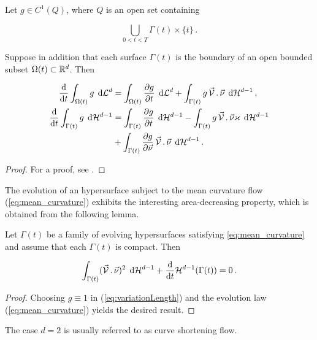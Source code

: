 \begin{lemma}
Let $g \in C^1(Q)$, where $Q$ is an open set containing

\begin{equation}
\bigcup_{0 < t < T} \Gamma(t) \times \{ t \} \, .
\end{equation}

Suppose in addition that each surface $\Gamma(t)$ is the boundary of an open
bounded subset $\Omega(t) \subset {\mathbb R}^{d}$. Then

\begin{align}
\frac{\rm d}{{\rm d}t} \int_{\Omega(t)} g \, \;{\rm d}{\cal L}^{d} & =
\int_{\Omega(t)} \frac{\partial g}{\partial t} \, \;{\rm d}{\cal L}^{d}
+ \int_{\Gamma(t)} g \,\vec{\mathcal{V}}\,.\,\vec\nu \, \;{\rm d}{\cal H}^{d-1} \, ,
\label{eq:variationVolume} \\
\frac{\rm d}{{\rm d}t} \int_{\Gamma(t)} g \, \;{\rm d}{\cal H}^{d-1} & =
\int_{\Gamma(t)} \frac{\partial g}{\partial t} \, \;{\rm d}{\cal H}^{d-1} -
\int_{\Gamma(t)} g \, \vec{\mathcal{V}}\,.\,\vec\nu \varkappa \, \;{\rm d}{\cal H}^{d-1}
\nonumber \\
& + \int_{\Gamma(t)} \frac{\partial g}{\partial \vec{\nu}}\,
\vec{\mathcal{V}}\,.\,\vec\nu \, \;{\rm d}{\cal H}^{d-1} \, .
\label{eq:variationLength}
\end{align}
\end{lemma}

\begin{proof}
For a proof, see \cite[\S~2.6, Lemma 2.1]{DeckelnickDE05}.
\end{proof}

The evolution of an hypersurface subject to the mean curvature flow
(\ref{eq:mean_curvature}) exhibits the interesting area-decreasing property,
which is obtained from the following lemma.

\begin{lemma}
Let $\Gamma(t)$ be a family of evolving hypersurfaces
satisfying \eqref{eq:mean_curvature} and assume that each $\Gamma(t)$ is
compact. Then

\begin{equation}
\int_{\Gamma(t)} (\vec{\mathcal{V}}\,.\,\vec\nu)^2 \, \;{\rm d}{\cal H}^{d-1} +
\frac{\rm d}{{\rm d}t} \mathcal{H}^{d-1}(\Gamma(t)) = 0 \, . \label{eq:lengthDecrease}
\end{equation}

\end{lemma}

\begin{proof}
Choosing $g \equiv 1$ in (\ref{eq:variationLength}) and the evolution law
(\ref{eq:mean_curvature}) yields the desired result.
\end{proof}
The case $d = 2$ is usually referred to as curve shortening flow.


